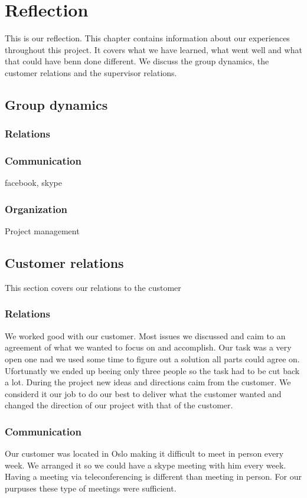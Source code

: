 \chapter{Reflection} 
\label{ch:reflection}


 This is our reflection. 
 This chapter contains information about our experiences throughout this project. 
 It covers what we have learned, what went well and what that could have benn done different. 
 We discuss the group dynamics, the customer relations and the supervisor relations.
 
\section{Group dynamics}
\subsection{Relations}
\subsection{Communication}
facebook, skype
\subsection{Organization}
Project management
 
 
 
\section{Customer relations}
This section covers our relations to the customer
\subsection{Relations}
We worked good with our customer.
Most issues we discussed and caim to an agreement of what we wanted to focus on and accomplish.
Our task was a very open one nad we used some time to figure out a solution all parts could agree on. Ufortunatly we ended up beeing only three people so the task had to be cut back a lot. 
During the project new ideas and directions caim from the customer.
We considerd it our job to do our best to deliver what the customer wanted and changed the direction of our project with that of the customer.
\subsection{Communication}
Our customer was located in Oslo making it difficult to meet in person every week.
We arranged it so we could have a skype meeting with him every week.
Having a meeting via teleconferencing is different than meeting in person.
For our purpuses these type of meetings were sufficient. 

